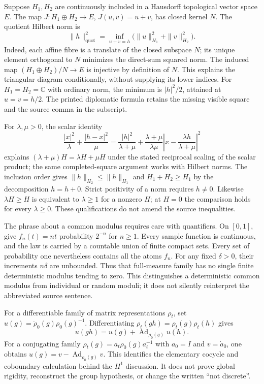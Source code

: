 \documentclass[11pt]{article}
\begin{document}
Suppose $H_1,H_2$ are continuously included in a Hausdorff topological vector space $E$. The map $J:H_1\oplus H_2\to E$, $J(u,v)=u+v$, has closed kernel $N$. The quotient Hilbert norm is
\[
\|h\|_{\mathrm{quot}}^2
=\inf_{u+v=h}\bigl(\|u\|_{H_1}^2+\|v\|_{H_2}^2\bigr).
\]
Indeed, each affine fibre is a translate of the closed subspace $N$; its unique element orthogonal to $N$ minimizes the direct-sum squared norm. The induced map $(H_1\oplus H_2)/N\to E$ is injective by definition of $N$. This explains the triangular diagram conditionally, without supplying its lower indices. For $H_1=H_2=\mathbb C$ with ordinary norm, the minimum is $|h|^2/2$, attained at $u=v=h/2$. The printed diplomatic formula retains the missing visible square and the source comma in the subscript.

For $\lambda,\mu>0$, the scalar identity
\[
\frac{|x|^2}{\lambda}+\frac{|h-x|^2}{\mu}
=\frac{|h|^2}{\lambda+\mu}
+\frac{\lambda+\mu}{\lambda\mu}
 \left|x-\frac{\lambda h}{\lambda+\mu}\right|^2
\]
explains $(\lambda+\mu)H=\lambda H+\mu H$ under the stated reciprocal scaling of the scalar product; the same completed-square argument works with Hilbert norms. The inclusion order gives $\|h\|_{H_2}\leq\|h\|_{H_1}$ and $H_1+H_2\geq H_1$ by the decomposition $h=h+0$. Strict positivity of a norm requires $h\ne0$. Likewise $\lambda H\geq H$ is equivalent to $\lambda\geq1$ for a nonzero $H$; at $H=0$ the comparison holds for every $\lambda\geq0$. These qualifications do not amend the source inequalities.

The phrase about a common modulus requires care with quantifiers. On $[0,1]$, give $f_n(t)=nt$ probability $2^{-n}$ for $n\geq1$. Every sample function is continuous, and the law is carried by a countable union of finite compact sets. Every set of probability one nevertheless contains all the atoms $f_n$. For any fixed $\delta>0$, their increments $n\delta$ are unbounded. Thus that full-measure family has no single finite deterministic modulus tending to zero. This distinguishes a deterministic common modulus from individual or random moduli; it does not silently reinterpret the abbreviated source sentence.

For a differentiable family of matrix representations $\rho_t$, set
$u(g)=\dot\rho_0(g)\rho_0(g)^{-1}$. Differentiating
$\rho_t(gh)=\rho_t(g)\rho_t(h)$ gives
\[
u(gh)=u(g)+\operatorname{Ad}_{\rho_0(g)}u(h).
\]
For a conjugating family $\rho_t(g)=a_t\rho_0(g)a_t^{-1}$ with
$a_0=I$ and $v=\dot a_0$, one obtains
$u(g)=v-\operatorname{Ad}_{\rho_0(g)}v$. This identifies the elementary cocycle and coboundary calculation behind the $H^1$ discussion. It does not prove global rigidity, reconstruct the group hypothesis, or change the written ``not discrete''.
\end{document}
